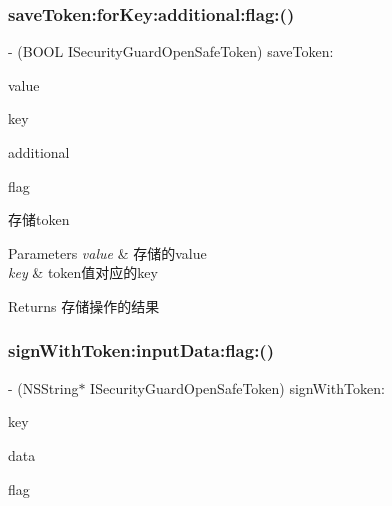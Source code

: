 \subsubsection{\texorpdfstring{save\+Token\+:for\+Key\+:additional\+:flag\+:()}{saveToken:forKey:additional:flag:()}}
{\footnotesize\ttfamily -\/ (B\+O\+OL I\+Security\+Guard\+Open\+Safe\+Token) save\+Token\+: \begin{DoxyParamCaption}\item[{(N\+S\+String $\ast$)}]{value }\item[{forKey:(N\+S\+String $\ast$)}]{key }\item[{additional:(N\+S\+String $\ast$)}]{additional }\item[{flag:(int)}]{flag }\end{DoxyParamCaption}}

存储token 
\begin{DoxyParams}{Parameters}
{\em value} & 存储的value \\
\hline
{\em key} & token值对应的key \\
\hline
\end{DoxyParams}
\begin{DoxyReturn}{Returns}
存储操作的结果 
\end{DoxyReturn}
\mbox{\label{protocol_i_security_guard_open_safe_token_01-p_ad746c3459ce7226442ae0f76c175aa4a}} 
\subsubsection{\texorpdfstring{sign\+With\+Token\+:input\+Data\+:flag\+:()}{signWithToken:inputData:flag:()}}
{\footnotesize\ttfamily -\/ (N\+S\+String$\ast$ I\+Security\+Guard\+Open\+Safe\+Token) sign\+With\+Token\+: \begin{DoxyParamCaption}\item[{(N\+S\+String $\ast$)}]{key }\item[{inputData:(N\+S\+Data $\ast$)}]{data }\item[{flag:(int)}]{flag }\end{DoxyParamCaption}}

